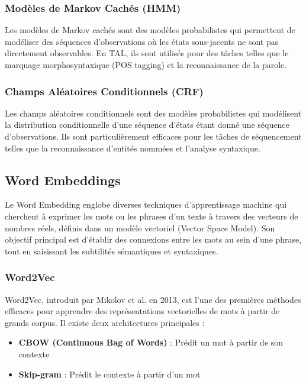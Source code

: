 \subsubsection{Modèles de Markov Cachés (HMM)}

Les modèles de Markov cachés sont des modèles probabilistes qui permettent de modéliser des séquences d'observations où les états sous-jacents ne sont pas directement observables. En TAL, ils sont utilisés pour des tâches telles que le marquage morphosyntaxique (POS tagging) et la reconnaissance de la parole.

\subsubsection{Champs Aléatoires Conditionnels (CRF)}

Les champs aléatoires conditionnels sont des modèles probabilistes qui modélisent la distribution conditionnelle d'une séquence d'états étant donné une séquence d'observations. Ils sont particulièrement efficaces pour les tâches de séquencement telles que la reconnaissance d'entités nommées et l'analyse syntaxique.

\subsection{Word Embeddings}

Le Word Embedding englobe diverses techniques d'apprentissage machine qui cherchent à exprimer les mots ou les phrases d'un texte à travers des vecteurs de nombres réels, définis dans un modèle vectoriel (Vector Space Model). Son objectif principal est d'établir des connexions entre les mots au sein d'une phrase, tout en saisissant les subtilités sémantiques et syntaxiques.

\subsubsection{Word2Vec}

Word2Vec, introduit par Mikolov et al. en 2013, est l'une des premières méthodes efficaces pour apprendre des représentations vectorielles de mots à partir de grands corpus. Il existe deux architectures principales :
\begin{itemize}
    \item \textbf{CBOW (Continuous Bag of Words)} : Prédit un mot à partir de son contexte
    \item \textbf{Skip-gram} : Prédit le contexte à partir d'un mot
\end{itemize}

